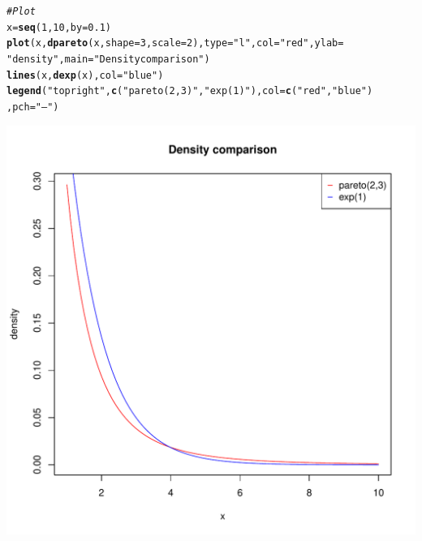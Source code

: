 \documentclass[11pt]{article}\usepackage[]{graphicx}\usepackage[]{color}
\makeatletter
\def\maxwidth{ %
  \ifdim\Gin@nat@width>\linewidth
    \linewidth
  \else
    \Gin@nat@width
  \fi
}
\newcommand{\hlnum}[1]{\textcolor[rgb]{0.686,0.059,0.569}{#1}}%
\newcommand{\hlstr}[1]{\textcolor[rgb]{0.192,0.494,0.8}{#1}}%
\newcommand{\hlcom}[1]{\textcolor[rgb]{0.678,0.584,0.686}{\textit{#1}}}%
\newcommand{\hlstd}[1]{\textcolor[rgb]{0.345,0.345,0.345}{#1}}%
\newcommand{\hlkwb}[1]{\textcolor[rgb]{0.69,0.353,0.396}{#1}}%
\newcommand{\hlkwc}[1]{\textcolor[rgb]{0.333,0.667,0.333}{#1}}%
\newcommand{\hlkwd}[1]{\textcolor[rgb]{0.737,0.353,0.396}{\textbf{#1}}}%
\newenvironment{kframe}{%
 \def\at@end@of@kframe{}%
 \ifinner\ifhmode%
  \def\at@end@of@kframe{\end{minipage}}%
  \begin{minipage}{\columnwidth}%
 \fi\fi%
 \def\FrameCommand##1{\hskip\@totalleftmargin \hskip-\fboxsep
 \colorbox{shadecolor}{##1}\hskip-\fboxsep
     \hskip-\linewidth \hskip-\@totalleftmargin \hskip\columnwidth}%
 \MakeFramed {\advance\hsize-\width
   \@totalleftmargin\z@ \linewidth\hsize
   \@setminipage}}%
 {\par\unskip\endMakeFramed%
 \at@end@of@kframe}
\newenvironment{knitrout}{}{} %
\makeatother
\begin{document}
\begin{knitrout}
\color{fgcolor}\begin{kframe}
\begin{alltt}
\hlcom{# Plot}
\hlstd{x}\hlkwb{=}\hlkwd{seq}\hlstd{(}\hlnum{1}\hlstd{,}\hlnum{10}\hlstd{,}\hlkwc{by}\hlstd{=}\hlnum{0.1}\hlstd{)}
\hlkwd{plot}\hlstd{(x,}\hlkwd{dpareto}\hlstd{(x,}\hlkwc{shape}\hlstd{=}\hlnum{3}\hlstd{,}\hlkwc{scale}\hlstd{=}\hlnum{2}\hlstd{),}\hlkwc{type}\hlstd{=}\hlstr{"l"}\hlstd{,}\hlkwc{col}\hlstd{=}\hlstr{"red"}\hlstd{,}\hlkwc{ylab}\hlstd{=}
       \hlstr{"density"}\hlstd{,}\hlkwc{main}\hlstd{=}\hlstr{"Density comparison"}\hlstd{)}
\hlkwd{lines}\hlstd{(x,}\hlkwd{dexp}\hlstd{(x),}\hlkwc{col}\hlstd{=}\hlstr{"blue"}\hlstd{)}
\hlkwd{legend}\hlstd{(}\hlstr{"topright"}\hlstd{,}\hlkwd{c}\hlstd{(}\hlstr{"pareto(2,3)"}\hlstd{,}\hlstr{"exp(1)"}\hlstd{),}\hlkwc{col}\hlstd{=}\hlkwd{c}\hlstd{(}\hlstr{"red"}\hlstd{,}\hlstr{"blue"}\hlstd{)}
       \hlstd{,}\hlkwc{pch}\hlstd{=}\hlstr{"--"}\hlstd{)}
\end{alltt}
\end{kframe}
\includegraphics[width=\maxwidth]{figure/unnamed-chunk-6-1} 

\end{knitrout}
\end{document}

